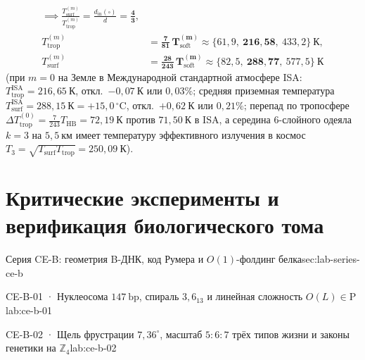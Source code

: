 \begin{theorem}[Классификация четырёх элементарных механизмов химических реакций по каналам $(V,E,\triangle,\square)$ и закон $8 = 3 + 2 + 3$ ферментативного катализа]
\begin{enumerate}[leftmargin=*]
\begin{equation}
\begin{aligned}
    \implies \frac{T_{\mathrm{surf}}^{(m)}}{T_{\mathrm{trop}}^{(m)}} = \frac{d_{\mathrm{in}}(\square)}{d} = \mathbf{\frac{4}{3}},\\
    T_{\mathrm{trop}}^{(m)} &= \mathbf{\frac{7}{81}\,T_{\mathrm{soft}}^{(m)}} \approx \bigl\{61{,}9,\ \mathbf{216{,}58},\ 433{,}2\bigr\}\ \text{К},\\
    T_{\mathrm{surf}}^{(m)} &= \mathbf{\frac{28}{243}\,T_{\mathrm{soft}}^{(m)}} \approx \bigl\{82{,}5,\ \mathbf{288{,}77},\ 577{,}5\bigr\}\ \text{К}
  \end{aligned}
  \end{equation}
  (при $m=0$ на Земле в Международной стандартной атмосфере ISA: $T_{\mathrm{trop}}^{\mathrm{ISA}} = 216{,}65\ \text{К}$, откл.\ $-0{,}07\ \text{К}$ или $0{,}03\%$; средняя приземная температура $T_{\mathrm{surf}}^{\mathrm{ISA}} = 288{,}15\ \text{К} = +15{,}0\,^\circ\text{C}$, откл.\ $+0{,}62\ \text{К}$ или $0{,}21\%$; перепад по тропосфере $\Delta T_{\mathrm{trop}}^{(0)} = \frac{7}{243}T_{\mathrm{HB}} = 72{,}19\ \text{К}$ против $71{,}50\ \text{К}$ в ISA, а середина 6-слойного одеяла $k=3$ на $5{,}5\ \text{км}$ имеет температуру эффективного излучения в космос $T_3 = \sqrt{T_{\mathrm{surf}}T_{\mathrm{trop}}} = 250{,}09\ \text{К}$).
\end{enumerate}
\end{theorem}





\chapter{Критические эксперименты и верификация биологического тома}
\label{ch:bio-critical-experiments}

\begin{labseries}{Серия CE-B: геометрия B-ДНК, код Румера и \texorpdfstring{$O(1)$}{O(1)}-фолдинг белка}{sec:lab-series-ce-b}
\begin{labrecord}{CE-B-01 · Нуклеосома \texorpdfstring{$147\ \mathrm{bp}$}{147 bp}, спираль \texorpdfstring{$3{,}6_{13}$}{3.6\_13} и линейная сложность \texorpdfstring{$O(L)\in\mathrm{P}$}{O(L) in P}}{lab:ce-b-01}

\end{labrecord}

\begin{labrecord}{CE-B-02 · Щель фрустрации \texorpdfstring{$7{,}36^\circ$}{7.36 deg}, масштаб \texorpdfstring{$5:6:7$}{5:6:7} трёх типов жизни и законы генетики на \texorpdfstring{$\mathbb{Z}_4$}{Z\_4}}{lab:ce-b-02}

\end{labrecord}
\end{labseries}
